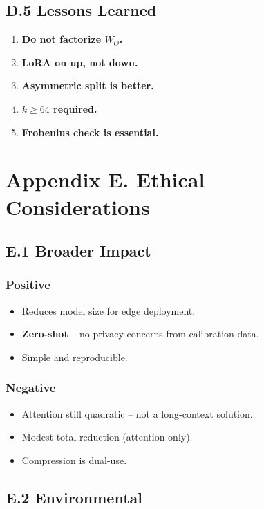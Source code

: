 \subsection{D.5 Lessons Learned}

\begin{enumerate}
\item \textbf{Do not factorize $W_O$.}
\item \textbf{LoRA on up, not down.}
\item \textbf{Asymmetric split is better.}
\item \textbf{$k \geq 64$ required.}
\item \textbf{Frobenius check is essential.}

\end{enumerate}


\section{Appendix E. Ethical Considerations}

\subsection{E.1 Broader Impact}

\subsubsection{Positive}
\begin{itemize}
\item Reduces model size for edge deployment.
\item \textbf{Zero-shot} -- no privacy concerns from calibration data.
\item Simple and reproducible.

\end{itemize}
\subsubsection{Negative}
\begin{itemize}
\item Attention still quadratic -- not a long-context solution.
\item Modest total reduction (attention only).
\item Compression is dual-use.

\end{itemize}
\subsection{E.2 Environmental}

